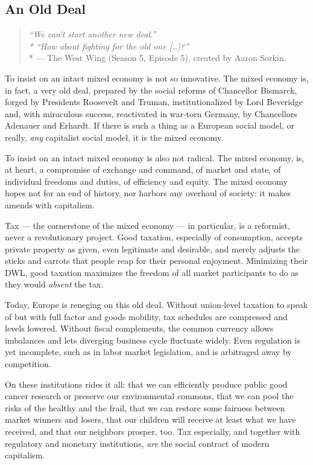 \subsection[An Old Deal]{An Old Deal} %

\begin{quote}
	\emph{``We can't start another new deal.''
	\\*
	``How about fighting for the old one [\ldots]?''}
	\\*
	--- The West Wing (Season 5, Episode 5), created by Aaron Sorkin.
\end{quote}

To insist on an intact mixed economy is not so innovative.
The mixed economy is, in fact, a very old deal, prepared by the social reforms of Chancellor Bismarck, forged by Presidents Roosevelt and Truman, institutionalized by Lord Beveridge and, with miraculous success, reactivated in war-torn Germany, by Chancellors Adenauer and Erhardt.
If there is such a thing as a European social model, or really, \emph{any} capitalist social model, it is the mixed economy.

To insist on an intact mixed economy is also not radical.
The mixed economy, is, at heart, a compromise of exchange and command, of market and state, of individual freedoms and duties, of efficiency and equity.
The mixed economy hopes not for an end of history, nor harbors any overhaul of society:
it makes amends with capitalism.

Tax --- the cornerstone of the mixed economy --- in particular, is a reformist, never a revolutionary project.
Good taxation, especially of consumption, accepts private property as given, even legitimate and desirable, and merely adjusts the sticks and carrots that people reap for their personal enjoyment.
Minimizing their \gls{DWL}, good taxation maximizes the freedom of all market participants to do as they would \emph{absent} the tax.

Today, Europe is reneging on this old deal.
Without union-level taxation to speak of but with full factor and goods mobility, tax schedules are compressed and levels lowered.
Without fiscal complements, the common currency allows imbalances and lets diverging business cycle fluctuate widely.
Even regulation is yet incomplete, such as in labor market legislation, and is arbitraged away by competition.

On these institutions rides it all:
that we can efficiently produce public good cancer research or preserve our environmental commons, that we can pool the risks of the healthy and the frail, that we can restore some fairness between market winners and losers, that our children will receive at least what we have received, and that our neighbors prosper, too.
Tax especially, and together with regulatory and monetary institutions, \emph{are} the social contract of modern capitalism.

